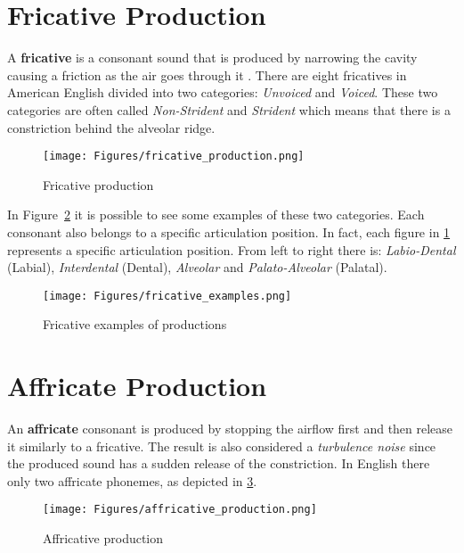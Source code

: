 \section{Fricative Production}
\label{sec:fricative_production}
A \textbf{fricative} is a consonant sound that is produced by narrowing the cavity causing a friction as the air goes through it \cite{fricatives}. There are eight fricatives in American English divided into two categories: \textit{Unvoiced} and \textit{Voiced}. These two categories are often called \textit{Non-Strident} and \textit{Strident} which means that there is a constriction behind the alveolar ridge.

\begin{figure}[!ht]
    \centering
    \texttt{[image: Figures/fricative\_production.png]}
    \caption{Fricative production \cite{mit_phonetics}}
    \label{fig:fricative_prod}
\end{figure}

\noindent In Figure~\ref{fig:fricative_ex} it is possible to see some examples of these two categories. Each consonant also belongs to a specific articulation position. In fact, each figure in \ref{fig:fricative_prod} represents a specific articulation position. From left to right there is: \textit{Labio-Dental} (Labial), \textit{Interdental} (Dental), \textit{Alveolar} and \textit{Palato-Alveolar} (Palatal).

\begin{figure}[!ht]
    \centering
    \texttt{[image: Figures/fricative\_examples.png]}
    \caption{Fricative examples of productions \cite{mit_phonetics}}
    \label{fig:fricative_ex}
\end{figure}


\section{Affricate Production}
\label{sec:Affricate Production}
An \textbf{affricate} consonant is produced by stopping the airflow first and then release it similarly to a fricative. The result is also considered a \textit{turbulence noise} since the produced sound has a sudden release of the constriction. In English there only two affricate phonemes, as depicted in \ref{fig:affricate_prod}.

\begin{figure}[!ht]
    \centering
    \texttt{[image: Figures/affricative\_production.png]}
    \caption{Affricative production \cite{mit_phonetics}}
    \label{fig:affricate_prod}
\end{figure}


